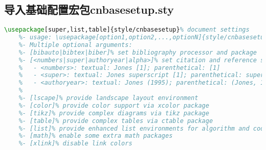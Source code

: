 \subsection{导入基础配置宏包cnbasesetup.sty}\label{ssec:cnbasesetup}
\begin{lstlisting}[language=tex]
    \usepackage[super,list,table]{style/cnbasesetup}% document settings
    %- usage: \usepackage[option1,option2,...,optionN]{style/cnbasesetup}
    %- Multiple optional arguments:
    %- [bibauto|bibtex|biber]% set bibliography processor and package
    %- [<numbers|super|authoryear|alpha>]% set citation and reference style
    %   - <numbers>: textual: Jones [1]; parenthetical: [1]
    %   - <super>: textual: Jones superscript [1]; parenthetical: superscript [1]
    %   - <authoryear>: textual: Jones (1995); parenthetical: (Jones, 1995)
    %
    %- [lscape]% provide landscape layout environment
    %- [color]% provide color support via xcolor package
    %- [tikz]% provide complex diagrams via tikz package
    %- [table]% provide complex tables via ctable package
    %- [list]% provide enhanced list environments for algorithm and coding
    %- [math]% enable some extra math packages
    %- [xlink]% disable link colors
\end{lstlisting}%
